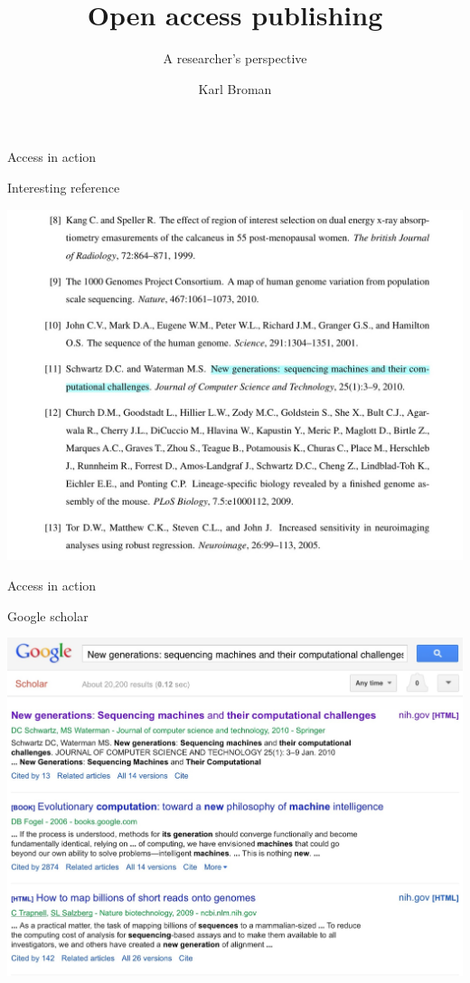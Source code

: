 \documentclass[12pt]{beamer}
\title{Open access publishing}
\subtitle{A researcher's perspective}
\author{Karl Broman}
\institute{Biostatistics \& Medical Informatics \\[2pt] University of Wisconsin{\textendash}Madison}
\date{}
\begin{document}
{
\frame{\titlepage}
}



\begin{frame}[t]{Access in action}

{ \footnotesize \color{subtitle}
Interesting reference
}

\bigskip
\centerline{
\includegraphics[height=0.75\textheight]{Images/img01.jpg}
}
\end{frame}


\begin{frame}[t]{Access in action}

{ \footnotesize \color{subtitle}
Google scholar
}

\bigskip
\centerline{
\includegraphics[height=0.75\textheight]{Images/img02.jpg}
}
\end{frame}
\end{document}
